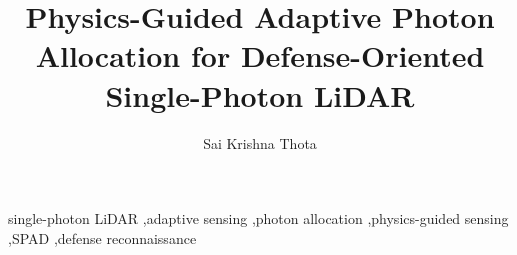 \documentclass[review]{elsarticle}
\begin{document}
\begin{frontmatter}

\title{Physics-Guided Adaptive Photon Allocation for Defense-Oriented Single-Photon LiDAR}

\author[aff1]{Sai Krishna Thota}


\begin{abstract}

\end{abstract}

\begin{keyword}
single-photon LiDAR \sep adaptive sensing \sep photon allocation
\sep physics-guided sensing \sep SPAD \sep defense reconnaissance
\end{keyword}

\end{frontmatter}












\end{document}
